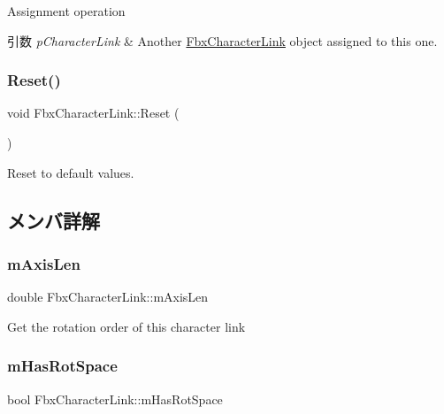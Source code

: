 Assignment operation 
\begin{DoxyParams}{引数}
{\em p\+Character\+Link} & Another \hyperlink{class_fbx_character_link}{Fbx\+Character\+Link} object assigned to this one. \\
\hline
\end{DoxyParams}
\mbox{\label{class_fbx_character_link_a9d0e6c6b7fc03ccb93283d79f763403f}} 
\subsubsection{\texorpdfstring{Reset()}{Reset()}}
{\footnotesize\ttfamily void Fbx\+Character\+Link\+::\+Reset (\begin{DoxyParamCaption}{ }\end{DoxyParamCaption})}

Reset to default values. 

\subsection{メンバ詳解}
\mbox{\label{class_fbx_character_link_a9d523e0ad398dcbab03548d725ed7d4e}} 
\subsubsection{\texorpdfstring{m\+Axis\+Len}{mAxisLen}}
{\footnotesize\ttfamily double Fbx\+Character\+Link\+::m\+Axis\+Len}



Get the rotation order of this character link 

\mbox{\label{class_fbx_character_link_a013df32c72b266e1b0c23ed6e88d6723}} 
\subsubsection{\texorpdfstring{m\+Has\+Rot\+Space}{mHasRotSpace}}
{\footnotesize\ttfamily bool Fbx\+Character\+Link\+::m\+Has\+Rot\+Space}



